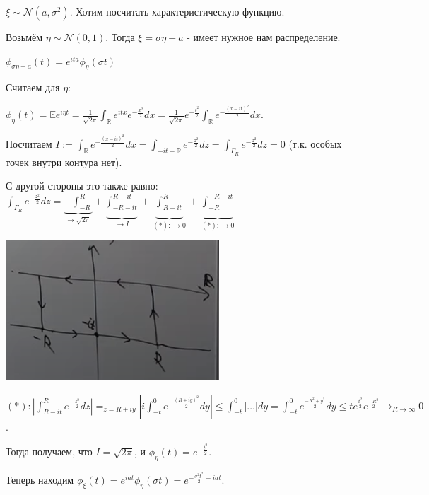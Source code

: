 \begin{example}
    $\xi \sim \mathcal{N}(a, \sigma^2)$. Хотим посчитать характеристическую функцию.

    Возьмём $\eta \sim \mathcal{N}(0, 1)$. Тогда $\xi = \sigma \eta + a$ - имеет нужное нам распределение.

    $\phi_{\sigma \eta + a}(t) = e^{ita} \phi_{\eta} (\sigma t)$

    Считаем для $\eta$:

    $\phi_{\eta}(t) = \mathbb{E} e^{i \eta t} = \frac{1}{\sqrt{2 \pi}} \int_{\mathbb{R}} e^{i t x} e^{-\frac{x^2}{2}} dx = \frac{1}{\sqrt{2 \pi}} e^{-\frac{t^2}{2}} \int_{\mathbb{R}} e^{- \frac{(x - it)^2}{2}} dx$.

    Посчитаем $I := \int_{\mathbb{R}} e^{-\frac{(x - it)^2}{2}} dx = \int_{-it + \mathbb{R}} e^{-\frac{z^2}{2}} dz = \int_{\Gamma_R} e^{-\frac{z^2}{2}} dz = 0$ (т.к. особых точек внутри контура нет).

    С другой стороны это также равно: $\int_{\Gamma_R} e^{-\frac{z^2}{2}} dz = \underbrace{-\int_{-R}^{R}}_{\to \sqrt{2 \pi}} + \underbrace{\int_{-R - it}^{R - it}}_{\to I} + \underbrace{\int_{R - it}^{R}}_{(*): \to 0} + \underbrace{\int_{-R}^{-R - it}}_{(*): \to 0}$


    \begin{center}
        \includegraphics[width=8cm]{./assets/03-characteristic-funcs/complex-arbitrary-value-example-1.png}
    \end{center}

    $(*): \left| \int_{R - it}^{R} e^{-\frac{z^2}{2}} dz \right| =_{z = R + i y} \left| i \int_{-t}^{0} e^{- \frac{(R + iy)^2}{2}} dy \right| \leq \int_{-t}^{0} |\ldots|dy = \int_{-t}^{0} e^{\frac{-R^2 + y^2}{2}} dy \leq t e^{\frac{t^2}{2}} e^{\frac{-R^2}{2}} \rightarrow_{R \to \infty} 0$.


    Тогда получаем, что $I = \sqrt{2 \pi}$, и $\phi_{\eta}(t) = e^{-\frac{t^2}{2}}$.


    Теперь находим $\phi_{\xi}(t) = e^{iat} \phi_{\eta}(\sigma t) = e^{- \frac{\sigma^2 t^2}{2} + iat}$.
\end{example}


